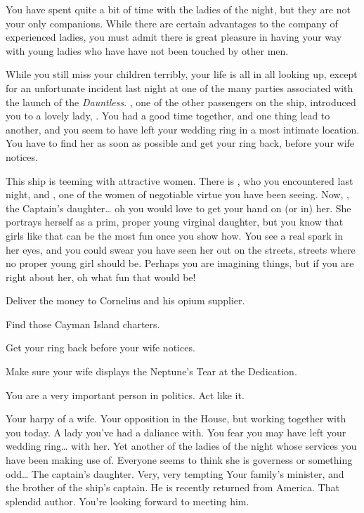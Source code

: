 \documentclass[char]{airship}
\begin{document}
You have spent quite a bit of time with the ladies of the night, but
they are not your only companions. While there are certain advantages
to the company of experienced ladies, you must admit there is great
pleasure in having your way with young ladies who have have not been
touched by other men. 

While you still miss your children terribly, your life is all in all
looking up, except for an unfortunate incident last night at one of
the many parties associated with the launch of the {\em
Dauntless}. \cDealer{\intro}, one of the other passengers on the ship,
introduced you to a lovely lady, \cNPCWhore{\intro}. You had a good
time together, and one thing lead to another, and you seem to have
left your wedding ring in a most intimate location. You have to find
her as soon as possible and get your ring back, before your wife
notices.

This ship is teeming with attractive women. There is \cNPCWhore{}, who
you encountered last night, and \cWhore{\intro}, one of the women of
negotiable virtue you have been seeing. Now, \cThief{\intro}, the
Captain's daughter{\ldots} oh you would love to get your hand on (or
in) her. She portrays herself as a prim, proper young virginal
daughter, but you know that girls like that can be the most fun once
you show how. You see a real spark in her eyes, and you could swear
you have seen her out on the streets, streets where no proper young
girl should be. Perhaps you are imagining things, but if you are right
about her, oh what fun that would be!

\begin{itemz}[Goals]
  \item Deliver the money to Cornelius and his opium supplier.
  \item Find those Cayman Island charters.
  \item Get your ring back before your wife notices.
  \item Make sure your wife displays the Neptune's Tear at the Dedication.
\end{itemz}

\begin{itemz}[Notes]
  \item You are a very important person in politics. Act like it.
\end{itemz}


\begin{contacts}
  \contact{\cJack{}} Your harpy of a wife.
  \contact{\cBoddy{}} Your opposition in the House, but working together with you today.
  \contact{\cNPCWhore{}} A lady you've had a daliance with. You fear you may have left your wedding ring{\ldots} with her.
  \contact{\cWhore{}} Yet another of the ladies of the night whose services you have been making use of. Everyone seems to think she is governess or something odd{\ldots}
  \contact{\cThief{}} The captain's daughter. Very, very tempting
  \contact{\cVicar{}} Your family's minister, and the brother of the ship's captain. He is recently returned from America.
  \contact{\cSaboteur{}} That splendid author. You're looking forward to meeting him.
\end{contacts}
\end{document}
